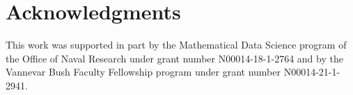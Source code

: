 \documentclass[11pt]{article}
\numberwithin{equation}{section}
\begin{document}














\section*{Acknowledgments}
This work was supported in part by the Mathematical Data Science program of the Office of Naval Research under grant number N00014-18-1-2764 and by the Vannevar Bush Faculty Fellowship program under grant number N00014-21-1-2941.





\end{document}
